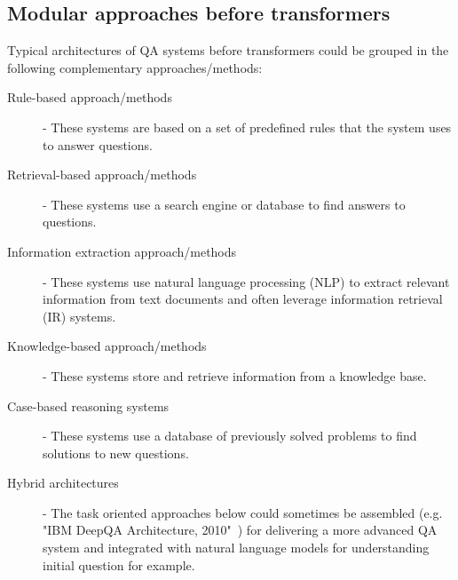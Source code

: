 \documentclass[acmsmall]{acmart}
\begin{document}
\subsection{Modular approaches before transformers}    
Typical architectures of QA systems before transformers could be grouped in the following complementary approaches/methods:
\begin{description}
    \item [Rule-based approach/methods] - These systems are based on a set of predefined rules that the system uses to answer questions.
    \item [Retrieval-based approach/methods] - These systems use a search engine or database to find answers to questions.
    \item [Information extraction approach/methods] - These systems use natural language processing (NLP) to extract relevant information from text documents and often leverage information retrieval (IR) systems.
    \item [Knowledge-based approach/methods] - These systems store and retrieve information from a knowledge base.
    \item [Case-based reasoning systems] - These systems use a database of previously solved problems to find solutions to new questions.
    \item [Hybrid architectures] - The task oriented approaches below could sometimes be assembled (e.g. "IBM DeepQA Architecture, 2010"~\citep{ferrucciBuildingWatsonOverview2010}) for delivering a more advanced QA system and integrated with natural language models for understanding initial question for example.
\end{description}
\end{document}
